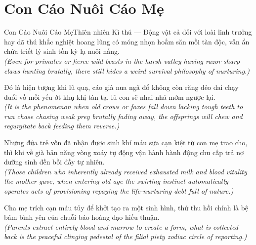 \section{Con Cáo Nuôi Cáo Mẹ}
\begin{truyen}{Con Cáo Nuôi Cáo Mẹ}{Thiên nhiên Kì thú --- Động vật}
 cả đối với loài linh trưởng hay dã thú khắc nghiệt hoang lũng có móng nhọn hoắm săn mồi tàn độc, vẫn ẩn chứa triết lý sinh tồn kỳ lạ nuôi nấng.\\[4pt]
\textit{(Even for primates or fierce wild beasts in the harsh valley having razor-sharp claws hunting brutally, there still hides a weird survival philosophy of nurturing.)}

Đó là hiện tượng khi lũ quạ, cáo già nua ngã đổ không còn răng dẻo dai chạy đuổi vồ mồi yếu ớt khụ khị tàn tạ, lũ con sẽ nhai nhả mớm ngược lại.\\[4pt]
\textit{(It is the phenomenon when old crows or foxes fall down lacking tough teeth to run chase chasing weak prey brutally fading away, the offsprings will chew and regurgitate back feeding them reverse.)}

Những đứa trẻ vốn đã nhận được sinh khí máu sữa cạn kiệt từ con mẹ trao cho, thì khi về già bản năng vòng xoáy tự động vận hành hành động chu cấp trả nợ dưỡng sinh đền bồi đầy tự nhiên.\\[4pt]
\textit{(Those children who inherently already received exhausted milk and blood vitality the mother gave, when entering old age the swirling instinct automatically operates acts of provisioning repaying the life-nurturing debt full of nature.)}

\end{truyen}
\begin{baihoc}
  Cha mẹ trích cạn máu tủy để khởi tạo ra một sinh hình, thứ thu hồi chính là bệ bám bình yên của chuỗi báo hoàng đạo hiếu thuận.\\[4pt]
  \textit{(Parents extract entirely blood and marrow to create a form, what is collected back is the peaceful clinging pedestal of the filial piety zodiac circle of reporting.)}
\end{baihoc}

